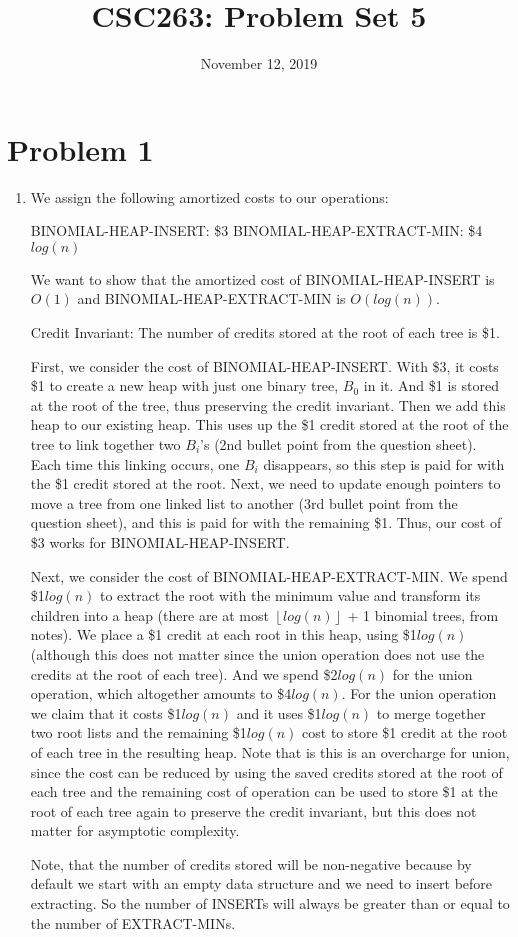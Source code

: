 \documentclass{article}
\title{CSC263: Problem Set 5}
\date{November 12, 2019}
\begin{document}
\maketitle

\section{Problem 1}

\begin{enumerate}[label=(\alph*)]

\item We assign the following amortized costs to our operations:

\newline BINOMIAL-HEAP-INSERT: \$3
\newline BINOMIAL-HEAP-EXTRACT-MIN: \$4$log(n)$

We want to show that the amortized cost of BINOMIAL-HEAP-INSERT is $O(1)$ and BINOMIAL-HEAP-EXTRACT-MIN is $O(log(n))$. 

Credit Invariant: The number of credits stored at the root of each tree is \$1.

First, we consider the cost of BINOMIAL-HEAP-INSERT. With \$3, it costs \$1 to create a new heap with just one binary tree, $B_0$ in it. And \$1 is stored at the root of the tree, thus preserving the credit invariant. Then we add this heap to our existing heap. This uses up the \$1 credit stored at the root of the tree to link together two $B_i$'s (2nd bullet point from the question sheet). Each time this linking occurs, one $B_i$ disappears, so this step is paid for with the \$1 credit stored at the root. Next, we need to update enough pointers to move a tree from one linked list to another (3rd bullet point from the question sheet), and this is paid for with the remaining \$1. Thus, our cost of \$3 works for BINOMIAL-HEAP-INSERT.

Next, we consider the cost of BINOMIAL-HEAP-EXTRACT-MIN. We spend \$1$log(n)$ to extract the root with the minimum value and transform its children into a heap (there are at most  ${\left\lfloor log(n)\right\rfloor}$ + 1 binomial trees, from notes). We place a \$1 credit at each root in this heap, using \$1$log(n)$ (although this does not matter since the union operation does not use the credits at the root of each tree). And we spend \$2$log(n)$ for the union operation, which altogether amounts to \$4$log(n)$. For the union operation we claim that it costs \$1$log(n)$ and it uses \$1$log(n)$ to merge together two root lists and the remaining \$1$log(n)$ cost to store \$1 credit at the root of each tree in the resulting heap. Note that is this is an overcharge for union, since the cost can be reduced by using the saved credits stored at the root of each tree and the remaining cost of operation can be used to store \$1 at the root of each tree again to preserve the credit invariant, but this does not matter for asymptotic complexity. 


Note, that the number of credits stored will be non-negative because by default we start with an empty data structure and we need to insert before extracting. So the number of INSERTs will always be greater than or equal to the number of EXTRACT-MINs.



\end{enumerate}
\end{document}
